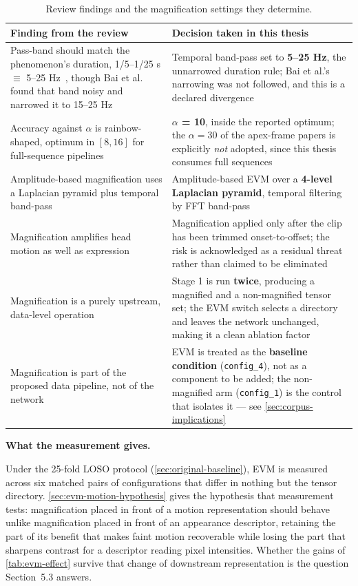 \begin{table}[htbp]
	\centering
	\footnotesize
	\begin{tabular}{p{6.0cm} p{6.5cm}}
		\hline
		\textbf{Finding from the review} & \textbf{Decision taken in this thesis} \\
		\hline
		Pass-band should match the phenomenon's duration, 1/5--1/25 s $\equiv$ 5--25 Hz~\cite{bai2021}, though Bai et al. found that band noisy and narrowed it to 15--25 Hz & Temporal band-pass set to \textbf{5--25 Hz}, the unnarrowed duration rule; Bai et al.'s narrowing was not followed, and this is a declared divergence \\
		Accuracy against $\alpha$ is rainbow-shaped, optimum in \textbf{$[8, 16]$} for full-sequence pipelines~\cite{liX2018} & \textbf{$\alpha$ = 10}, inside the reported optimum; the $\alpha = 30$ of the apex-frame papers is explicitly \textit{not} adopted, since this thesis consumes full sequences \\
		Amplitude-based magnification uses a Laplacian pyramid plus temporal band-pass~\cite{bai2021} & Amplitude-based EVM over a \textbf{4-level Laplacian pyramid}, temporal filtering by FFT band-pass \\
		Magnification amplifies head motion as well as expression~\cite{liX2018} & Magnification applied only after the clip has been trimmed onset-to-offset; the risk is acknowledged as a residual threat rather than claimed to be eliminated \\
		Magnification is a purely upstream, data-level operation & Stage 1 is run \textbf{twice}, producing a magnified and a non-magnified tensor set; the EVM switch selects a directory and leaves the network unchanged, making it a clean ablation factor \\
		Magnification is part of the proposed data pipeline, not of the network & EVM is treated as the \textbf{baseline condition} (\texttt{config\_4}), not as a component to be added; the non-magnified arm (\texttt{config\_1}) is the control that isolates it --- see \autoref{sec:corpus-implications} \\
		\hline
	\end{tabular}
	\caption[Review findings and the magnification settings they determine]{Review findings and the magnification settings they determine.}
	\label{tab:evm-settings}
\end{table}

\textbf{What the measurement gives.}

Under the 25-fold LOSO protocol (\autoref{sec:original-baseline}), EVM is measured across six matched pairs of configurations that differ in nothing but the tensor directory. \autoref{sec:evm-motion-hypothesis} gives the hypothesis that measurement tests: magnification placed in front of a motion representation should behave unlike magnification placed in front of an appearance descriptor, retaining the part of its benefit that makes faint motion recoverable while losing the part that sharpens contrast for a descriptor reading pixel intensities. Whether the gains of \autoref{tab:evm-effect} survive that change of downstream representation is the question Section~5.3 answers.

